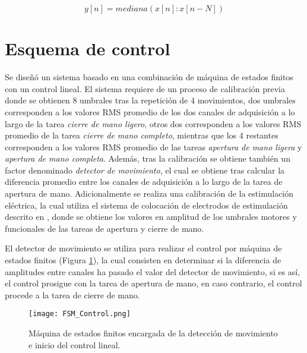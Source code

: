 \begin{equation}
	y[n] = mediana(x[n]:x[n-N])
	\label{Ecu: Mediana}
\end{equation}


\newpage
\section{Esquema de control}
Se diseñó un sistema basado en una combinación de máquina de estados finitos con un control lineal. El sistema requiere de un proceso de calibración previa donde se obtienen 8 umbrales tras la repetición de 4 movimientos, dos umbrales corresponden a los valores RMS promedio de los dos canales de adquisición a lo largo de la tarea \emph{cierre de mano ligero}, otros dos corresponden a los valores RMS promedio de la tarea \emph{cierre de mano completo}, mientras que los 4 restantes corresponden a los valores RMS promedio de las tareas \emph{apertura de mano ligera} y \emph{apertura de mano completa}. Además, tras la calibración se obtiene también un factor denominado \emph{detector de movimiento}, el cual se obtiene tras calcular la diferencia promedio entre los canales de adquisición a lo largo de la tarea de apertura de mano. Adicionalmente se realiza una calibración de la estimulación eléctrica, la cual utiliza el sistema de colocación de electrodos de estimulación descrito en \cite{AnaMartin2019}, donde se obtiene los valores en amplitud de los umbrales motores y funcionales de las tareas de apertura y cierre de mano.

El detector de movimiento se utiliza para realizar el control por máquina de estados finitos (Figura \ref{Figura: FSM_Control}), la cual consisten en determinar si la diferencia de amplitudes entre canales ha pasado el valor del detector de movimiento, si es así, el control prosigue con la tarea de apertura de mano, en caso contrario, el control procede a la tarea de cierre de mano.

\begin{figure}[htbp]
	\centering
	\texttt{[image: FSM\_Control.png]}
	\caption[FSM para control]{Máquina de estados finitos encargada de la detección de movimiento e inicio del control lineal.}
	\label{Figura: FSM_Control}
\end{figure}

